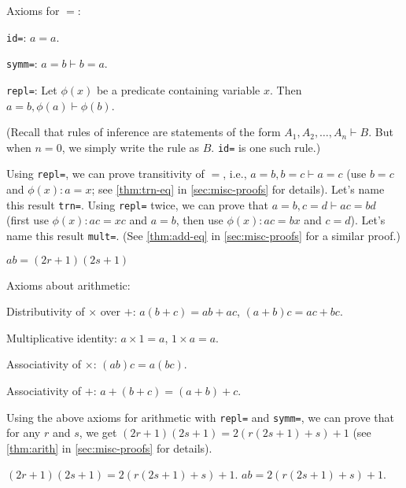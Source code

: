 Axioms for $=$:
\begin{tightemize}
\item \texttt{id=}: $a = a$.
\item \texttt{symm=}: $a = b \vdash b = a$.
\item \texttt{repl=}: Let $\phi(x)$ be a predicate containing variable $x$.
Then $a = b, \phi(a) \vdash \phi(b)$.
\end{tightemize}
(Recall that rules of inference are statements of the form $A_1, A_2, \ldots, A_n \vdash B$.
But when $n = 0$, we simply write the rule as $B$. \texttt{id=} is one such rule.)

Using \texttt{repl=}, we can prove transitivity of $=$, i.e.,
$a = b, b = c \vdash a = c$ (use $b = c$ and $\phi(x): a = x$;
see \cref{thm:trn-eq} in \cref{sec:misc-proofs} for details).
Let's name this result \texttt{trn=}.
Using \texttt{repl=} twice, we can prove that $a = b, c = d \vdash ac = bd$
(first use $\phi(x): ac = xc$ and $a = b$, then use $\phi(x): ac = bx$ and $c = d$).
Let's name this result \texttt{mult=}.
(See \cref{thm:add-eq} in \cref{sec:misc-proofs} for a similar proof.)

\begin{formalproof}
\State \label{p1:abeq}$ab = (2r + 1)(2s + 1)$
\end{formalproof}

Axioms about arithmetic:
\begin{tightemize}
\item Distributivity of $\times$ over $+$: $a(b+c) = ab + ac$, $(a+b)c = ac + bc$.
\item Multiplicative identity: $a \times 1 = a$, $1 \times a = a$.
\item Associativity of $\times$: $(ab)c = a(bc)$.
\item Associativity of $+$: $a + (b + c) = (a + b) + c$.
\end{tightemize}

Using the above axioms for arithmetic with \texttt{repl=} and \texttt{symm=},
we can prove that for any $r$ and $s$, we get $(2r+1)(2s+1) = 2(r(2s+1)+s) + 1$
(see \cref{thm:arith} in \cref{sec:misc-proofs} for details).

\begin{formalproof}
\State \label{p1:abeq2}$(2r+1)(2s+1) = 2(r(2s+1)+s) + 1$.
\State \label{p1:abeq3}$ab = 2(r(2s+1)+s) + 1$.
\end{formalproof}

